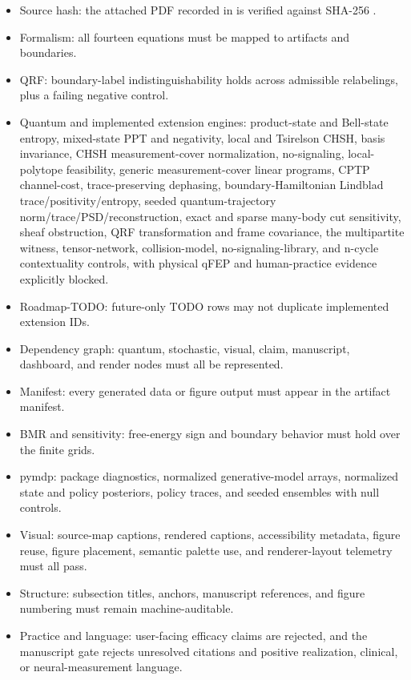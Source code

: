 \documentclass[
]{article}
\providecommand{\tightlist}{%
  \setlength{\itemsep}{0pt}\setlength{\parskip}{0pt}}
\begin{document}
\begin{itemize}
\tightlist
\item
  Source hash: the attached PDF recorded in
   is verified against
  SHA-256
  .
\item
  Formalism: all fourteen equations must be mapped to artifacts and
  boundaries.
\item
  QRF: boundary-label indistinguishability holds across admissible
  relabelings, plus a failing negative control.
\item
  Quantum and implemented extension engines: product-state and
  Bell-state entropy, mixed-state PPT and negativity, local and
  Tsirelson CHSH, basis invariance, CHSH measurement-cover
  normalization, no-signaling, local-polytope feasibility, generic
  measurement-cover linear programs, CPTP channel-cost, trace-preserving
  dephasing, boundary-Hamiltonian Lindblad trace/positivity/entropy,
  seeded quantum-trajectory norm/trace/PSD/reconstruction, exact and
  sparse many-body cut sensitivity, sheaf obstruction, QRF
  transformation and frame covariance, the multipartite witness,
  tensor-network, collision-model, no-signaling-library, and n-cycle
  contextuality controls, with physical qFEP and human-practice evidence
  explicitly blocked.
\item
  Roadmap-TODO: future-only TODO rows may not duplicate implemented
  extension IDs.
\item
  Dependency graph: quantum, stochastic, visual, claim, manuscript,
  dashboard, and render nodes must all be represented.
\item
  Manifest: every generated data or figure output must appear in the
  artifact manifest.
\item
  BMR and sensitivity: free-energy sign and boundary behavior must hold
  over the finite grids.
\item
  pymdp: package diagnostics, normalized generative-model arrays,
  normalized state and policy posteriors, policy traces, and seeded
  ensembles with null controls.
\item
  Visual: source-map captions, rendered captions, accessibility
  metadata, figure reuse, figure placement, semantic palette use, and
  renderer-layout telemetry must all pass.
\item
  Structure: subsection titles, anchors, manuscript references, and
  figure numbering must remain machine-auditable.
\item
  Practice and language: user-facing efficacy claims are rejected, and
  the manuscript gate rejects unresolved citations and positive
  realization, clinical, or neural-measurement language.
\end{itemize}
\end{document}
